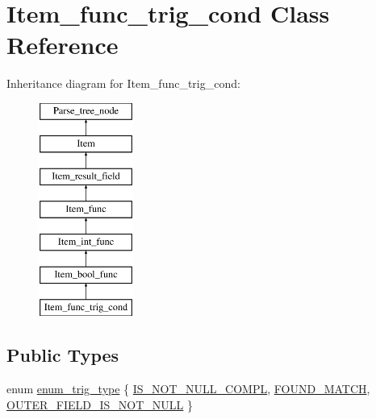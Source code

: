 \hypertarget{classItem__func__trig__cond}{}\section{Item\+\_\+func\+\_\+trig\+\_\+cond Class Reference}
\label{classItem__func__trig__cond}
Inheritance diagram for Item\+\_\+func\+\_\+trig\+\_\+cond\+:\begin{figure}[H]
\begin{center}
\leavevmode
\includegraphics[height=7.000000cm]{classItem__func__trig__cond}
\end{center}
\end{figure}
\subsection*{Public Types}
\begin{DoxyCompactItemize}
\item 
enum \mbox{\hyperlink{classItem__func__trig__cond_a1e9dc4e0397faf1caecedcd02df5e8c9}{enum\+\_\+trig\+\_\+type}} \{ \mbox{\hyperlink{classItem__func__trig__cond_a1e9dc4e0397faf1caecedcd02df5e8c9a8441979b79fd1b4f6db7a9cdb8585c50}{I\+S\+\_\+\+N\+O\+T\+\_\+\+N\+U\+L\+L\+\_\+\+C\+O\+M\+PL}}, 
\mbox{\hyperlink{classItem__func__trig__cond_a1e9dc4e0397faf1caecedcd02df5e8c9a490f1e4a475225d383e9059f74684dc5}{F\+O\+U\+N\+D\+\_\+\+M\+A\+T\+CH}}, 
\mbox{\hyperlink{classItem__func__trig__cond_a1e9dc4e0397faf1caecedcd02df5e8c9a8b407e3eb2cd4126346fe3158967e963}{O\+U\+T\+E\+R\+\_\+\+F\+I\+E\+L\+D\+\_\+\+I\+S\+\_\+\+N\+O\+T\+\_\+\+N\+U\+LL}}
 \}
\end{DoxyCompactItemize}
